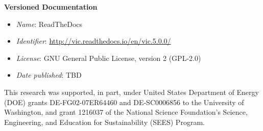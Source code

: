 \documentclass[gmd, manuscript]{copernicus}
\begin{document}
{\bf Versioned Documentation}

\begin{itemize}
	\item \textit{Name}: ReadTheDocs
	\item \textit{Identifier}: \url{http://vic.readthedocs.io/en/vic.5.0.0/}
	\item \textit{License}: GNU General Public License, version 2 (GPL-2.0)
	\item \textit{Date published}: TBD
\end{itemize}



\begin{acknowledgements}
  This research was supported, in part, under United States Department of Energy (DOE) grants DE-FG02-07ER64460 and DE-SC0006856 to the University of Washington, and grant 1216037 of the National Science Foundation's Science, Engineering, and Education for Sustainability (SEES) Program.
\end{acknowledgements}




%
%
%





\end{document}
